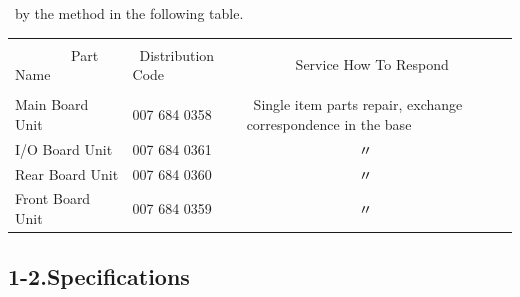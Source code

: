 ﻿\documentclass[twoside,a4paper,12pt]{article}
\begin{document}
 \ by the method in the following table.\\[-2mm]

\small

\setlength{\arrayrulewidth}{0.5mm}
\setlength{\tabcolsep}{2mm}
\begin{tabular}{|p{55mm}|p{40mm}|p{62mm}|}
\hline
& & \\[-2mm]
\ \ \ \ \ \ \ \ Part Name & \ Distribution Code & \ \ \ \ \ \ \ Service How To Respond\\
\hline
& & \\[-4mm]
Main Board Unit & 007 684 0358 & \ Single item parts repair, exchange correspondence in the base\\
I/O Board Unit & 007 684 0361 & \ \ \ \ \ \ \ \ \ \ \ \ \ \ \ \ 〃\\
Rear Board Unit & 007 684 0360 & \ \ \ \ \ \ \ \ \ \ \ \ \ \ \ \ 〃\\
Front Board Unit & 007 684 0359 & \ \ \ \ \ \ \ \ \ \ \ \ \ \ \ \ 〃\\[4mm]
\hline
\end{tabular}

\newpage

\subsection*{1-2.Specifications}
\end{document}
